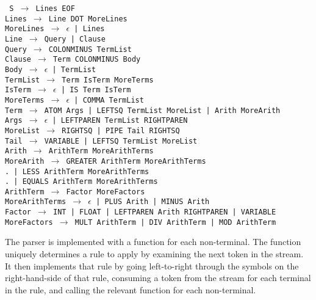 \documentclass[12pt]{article}
\begin{document}
\texttt{
S $\rightarrow$ Lines EOF\\
Lines $\rightarrow$ Line DOT MoreLines\\
MoreLines $\rightarrow$ $\epsilon$ | Lines\\
Line $\rightarrow$ Query | Clause\\
Query $\rightarrow$ COLONMINUS TermList\\
Clause $\rightarrow$ Term COLONMINUS Body\\
Body $\rightarrow$ $\epsilon$ | TermList\\
TermList $\rightarrow$ Term IsTerm MoreTerms\\
IsTerm $\rightarrow$ $\epsilon$ | IS Term IsTerm\\
MoreTerms $\rightarrow$ $\epsilon$ | COMMA TermList\\
Term $\rightarrow$ ATOM Args | LEFTSQ TermList MoreList | Arith MoreArith\\
Args $\rightarrow$ $\epsilon$ | LEFTPAREN TermList RIGHTPAREN\\
MoreList $\rightarrow$ RIGHTSQ | PIPE Tail RIGHTSQ\\
Tail $\rightarrow$ VARIABLE | LEFTSQ TermList MoreList\\
Arith $\rightarrow$ ArithTerm MoreArithTerms\\
MoreArith $\rightarrow$ GREATER ArithTerm MoreArithTerms\\
.\hspace{50px} | LESS ArithTerm MoreArithTerms \\
.\hspace{50px} | EQUALS ArithTerm MoreArithTerms\\
ArithTerm $\rightarrow$ Factor MoreFactors\\
MoreArithTerms $\rightarrow$ $\epsilon$ | PLUS Arith | MINUS Arith\\
Factor $\rightarrow$ INT | FLOAT | LEFTPAREN Arith RIGHTPAREN | VARIABLE\\
MoreFactors $\rightarrow$ MULT ArithTerm | DIV ArithTerm | MOD ArithTerm
}

The parser is implemented with a function for each non-terminal. 
The function uniquely determines a rule to apply by examining the next token in the stream. 
It then implements that rule by going left-to-right through the symbols on the right-hand-side of that rule, consuming a token from the stream for each terminal in the rule, and calling the relevant function for each non-terminal.

\end{document}
